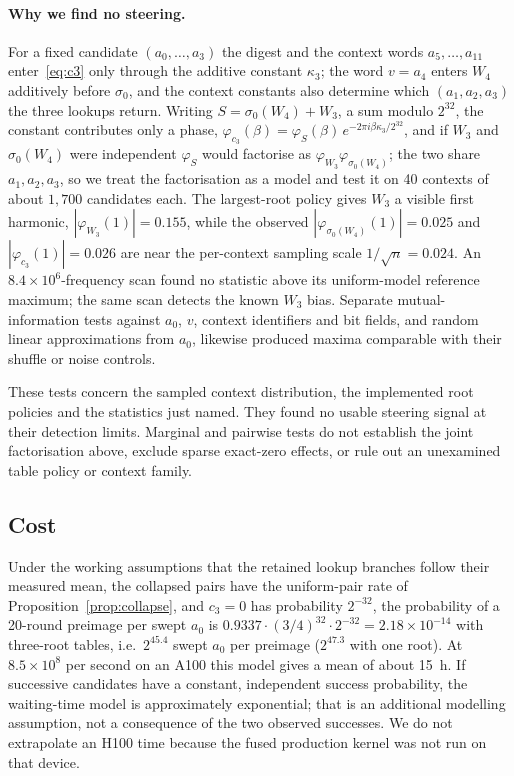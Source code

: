 \documentclass[11pt,a4paper]{article}
\newcommand{\sig}[1]{\sigma_{#1}}
\begin{document}
\paragraph{Why we find no steering.}
For a fixed candidate $(a_0,\dots,a_3)$ the digest and the context words
$a_5,\dots,a_{11}$ enter~\eqref{eq:c3} only through the additive constant
$\kappa_3$; the word $v=a_4$ enters $W_4$ additively before $\sig0$, and the
context constants also determine which $(a_1,a_2,a_3)$ the three lookups
return.
Writing $S=\sig0(W_4)+W_3$, a sum modulo $2^{32}$, the constant contributes
only a phase, $\varphi_{c_3}(\beta)=\varphi_{S}(\beta)\,e^{-2\pi i\beta
\kappa_3/2^{32}}$, and if $W_3$ and $\sig0(W_4)$ were independent $\varphi_S$
would factorise as $\varphi_{W_3}\varphi_{\sig0(W_4)}$; the two share
$a_1,a_2,a_3$, so we treat the factorisation as a model and test it on 40
contexts of about $1{,}700$ candidates each.  The largest-root policy gives
$W_3$ a visible first harmonic, $|\varphi_{W_3}(1)|=0.155$, while the observed
$|\varphi_{\sig0(W_4)}(1)|=0.025$ and $|\varphi_{c_3}(1)|=0.026$ are near the
per-context sampling scale $1/\sqrt n=0.024$.  An $8.4\times10^6$-frequency
scan found no statistic above its uniform-model reference maximum; the same
scan detects the known $W_3$ bias.  Separate mutual-information tests against
$a_0$, $v$, context identifiers and bit fields, and random linear
approximations from $a_0$, likewise produced maxima comparable with their
shuffle or noise controls.

These tests concern the sampled context distribution, the implemented root
policies and the statistics just named.  They found no usable steering signal
at their detection limits.  Marginal and pairwise tests do not establish the
joint factorisation above, exclude sparse exact-zero effects, or rule out an
unexamined table policy or context family.

\subsection{Cost}
\label{sec:cost20}

Under the working assumptions that the retained lookup branches follow their
measured mean, the collapsed pairs have the uniform-pair rate of
Proposition~\ref{prop:collapse}, and $c_3=0$ has probability $2^{-32}$, the
probability of a 20-round preimage per swept $a_0$ is
$0.9337\cdot(3/4)^{32}\cdot 2^{-32}=2.18\times10^{-14}$ with three-root tables,
i.e.\ $2^{45.4}$ swept $a_0$ per preimage ($2^{47.3}$ with one root).  At
$8.5\times10^{8}$ per second on an A100 this model gives a mean of about
15~h.  If successive candidates have a constant, independent success
probability, the waiting-time model is approximately exponential; that is an
additional modelling assumption, not a consequence of the two observed
successes.  We do not extrapolate an H100 time because the fused production
kernel was not run on that device.
\end{document}
